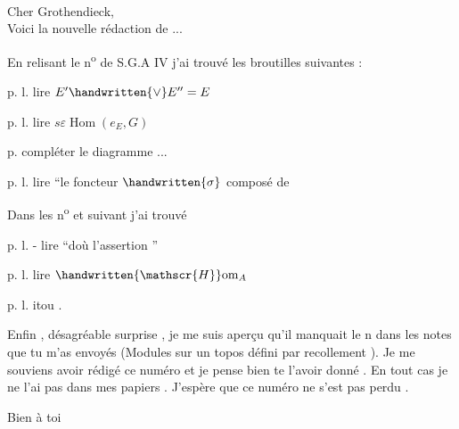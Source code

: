 \begin{flushright}
\\
\end{flushright}
Cher Grothendieck,\\

Voici la nouvelle rédaction de ...

En relisant le n\textsuperscript{o}  de S.G.A  IV j'ai trouvé les broutilles suivantes :

p.  l.  lire \(E'\handwritten{\vee} E'' = E\)

p.  l.  lire \(s\varepsilon\operatorname{Hom}(e_E,G)\)

p.  compléter le diagramme ...

p.  l.  lire ``le foncteur \(\handwritten{\sigma}\) composé de

Dans les n\textsuperscript{o}  et suivant j'ai trouvé

p.  l. - lire ``doù l'assertion ''

p.  l.  lire \(\handwritten{\mathscr{H}}\mathrm{om}_A\)

p. l.  itou .

\reversemarginpar
{}
\normalmarginpar
Enfin , désagréable surprise , je me suis aperçu qu'il manquait le n  dans les notes que tu m'as envoyés (Modules sur un topos défini par recollement ). Je me souviens avoir rédigé ce numéro et je pense bien te l'avoir donné . En tout cas je ne l'ai pas dans mes papiers . J'espère que ce numéro ne s'est pas perdu .

\begin{flushright}
Bien à toi\\
\\
\end{flushright}
